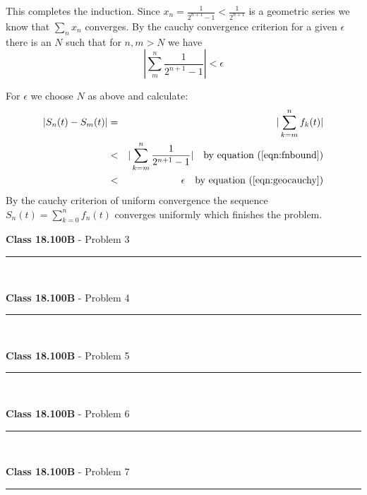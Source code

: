 \documentclass[11pt,reqno]{article}
\begin{document}
This completes the induction.
Since $x_n = \frac{1}{2^{n+1}-1} < \frac{1}{2^{n+1}}$ is a geometric series we know that $\sum_n x_n$ converges. By the cauchy convergence criterion for a given $\epsilon$ there is an $N$ such that for $n,m > N$ we have 
\begin{equation}
|\sum_m^n  \frac{1}{2^{n+1}-1} | < \epsilon \label{eqn:geocauchy}
\end{equation}

\noindent For $\epsilon$ we choose $N$ as above and calculate:
\begin{eqnarray*}
|S_n(t)-S_m(t)| &=& |\sum_{k=m}^n f_k(t)| \\
		         &<& |\sum_{k=m}^n \frac{1}{2^{n+1}-1}| \quad \text{by equation ($\ref{eqn:fnbound}$)} \\
		         &<& \epsilon  \quad \text{by equation ($\ref{eqn:geocauchy}$)} \\
\end{eqnarray*}
By the cauchy criterion of uniform convergence the sequence $S_n(t) = \sum_{k=0}^n f_n(t)$ converges uniformly which finishes the problem.

\vspace{15pt}
\begin{flushleft} 
\textbf{Class 18.100B} - Problem 3\\
\rule{500pt}{1pt}\\
\end{flushleft} 
 
\vspace{15pt}
\begin{flushleft} 
\textbf{Class 18.100B} - Problem 4\\
\rule{500pt}{1pt}\\
\end{flushleft} 


\vspace{15pt}
\begin{flushleft} 
\textbf{Class 18.100B} - Problem 5\\
\rule{500pt}{1pt}\\
\end{flushleft} 


\vspace{15pt}
\begin{flushleft} 
\textbf{Class 18.100B} - Problem 6\\
\rule{500pt}{1pt}\\
\end{flushleft} 


\vspace{15pt}
\begin{flushleft} 
\textbf{Class 18.100B} - Problem 7\\
\rule{500pt}{1pt}\\
\end{flushleft} 
\end{document}
